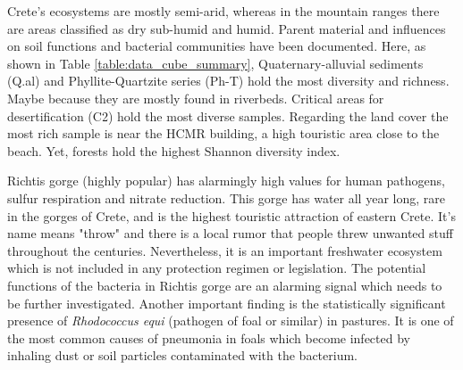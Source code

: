 Crete's ecosystems are mostly semi-arid, whereas in the mountain ranges there 
are areas classified as dry sub-humid and humid. Parent material and influences
on soil functions and bacterial communities have been documented. Here, as shown in Table \ref{table:data_cube_summary},
Quaternary-alluvial sediments (Q.al) and Phyllite-Quartzite series (Ph-T) hold the most diversity 
and richness. Maybe because they are mostly found in riverbeds. Critical areas for 
desertification (C2) hold the most diverse samples. Regarding the land cover the most
rich sample is near the HCMR building, a high touristic area close to the beach. Yet, forests
hold the highest Shannon diversity index.

Richtis gorge (highly popular) has alarmingly high values for human pathogens, sulfur respiration and
nitrate reduction. This gorge has water all year long, rare in the gorges of Crete,
and is the highest touristic attraction of eastern Crete. It's name means "throw" and 
there is a local rumor that people threw unwanted stuff throughout the centuries. 
Nevertheless, it is an important freshwater ecosystem which is not included in 
any protection regimen or legislation.
The potential functions of the bacteria in Richtis gorge are an alarming signal which needs to be further investigated.
Another important finding is the statistically significant presence of \textit{Rhodococcus equi} (pathogen of foal or similar)
in pastures. It is one of the most common causes of pneumonia in foals which
become infected by inhaling dust or soil particles contaminated with the bacterium.

